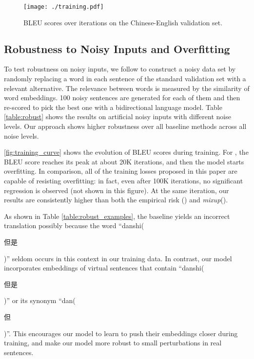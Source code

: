 \documentclass[11pt,a4paper]{article}
\newcommand{\mixup}{\textit{mixup}\xspace}
\begin{document}
\begin{figure}[!t]
\centering
\texttt{[image: ./training.pdf]} 
\caption{BLEU scores over iterations on the Chinese-English validation set.}
\label{fig:training_curve}
\end{figure}




\subsection{Robustness to Noisy Inputs and Overfitting}
To test robustness on noisy inputs, we follow \citet{Cheng:19} to construct a noisy data set by randomly replacing a word in each sentence of the standard validation set with a relevant alternative. The relevance between words is measured by the similarity of word embeddings. 100 noisy sentences are generated for each of them and then re-scored to pick the best one with a bidirectional language model. Table \ref{table:robust} shows the results on artificial noisy inputs with different noise levels. Our approach shows higher robustness over all baseline methods across all noise levels.

\autoref{fig:training_curve} shows the evolution of BLEU scores during training. For , the BLEU score reaches its peak at about 20K iterations, and then the model starts overfitting. In comparison, all of the training losses proposed in this paper are capable of resisting overfitting: in fact, even after 100K iterations, no significant regression is observed (not shown in this figure).
At the same iteration, our results are consistently higher than both the empirical risk () and \mixup ().

As shown in Table \ref{table:robust_examples}, the baseline yields an incorrect translation possibly because the word “danshi(\begin{CJK*}{UTF8}{gbsn}{但是}\end{CJK*})” seldom occurs in this context in our training data. In contrast, our model incorporates embeddings of virtual sentences that contain “danshi(\begin{CJK*}{UTF8}{gbsn}{但是}\end{CJK*})” or its synonym “dan(\begin{CJK*}{UTF8}{gbsn}{但}\end{CJK*})”. This encourages our model to learn to push their embeddings closer during training, and make our model more robust to small perturbations in real sentences.
\end{document}
